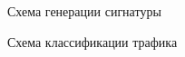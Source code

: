 \documentclass[10pt]{beamer}
\begin{document}
\begin{frame}{Схема генерации сигнатуры}
    \begin{figure}
        \begin{adjustwidth}{-2em}{-2em}
            \centering
            
        \end{adjustwidth}
    \end{figure}
\end{frame}

\begin{frame}{Схема классификации трафика}
    \begin{figure}
        \begin{adjustwidth}{-2em}{-2em}
            \centering
            
        \end{adjustwidth}
    \end{figure}
\end{frame}
\end{document}
